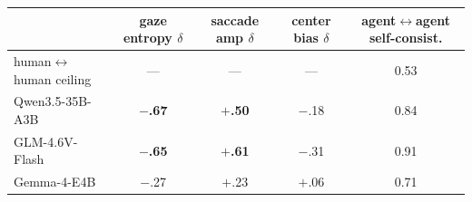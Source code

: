 \begin{tabular}{lcccc}
\toprule
 & gaze entropy $\delta$ & saccade amp $\delta$ & center bias $\delta$ & agent$\leftrightarrow$agent self-consist. \\
\midrule
human$\leftrightarrow$human ceiling & --- & --- & --- & 0.53 \\
Qwen3.5-35B-A3B & \textbf{$-$.67} & \textbf{$+$.50} & $-$.18 & 0.84 \\
GLM-4.6V-Flash & \textbf{$-$.65} & \textbf{$+$.61} & $-$.31 & 0.91 \\
Gemma-4-E4B & $-$.27 & $+$.23 & $+$.06 & 0.71 \\
\bottomrule
\end{tabular}
